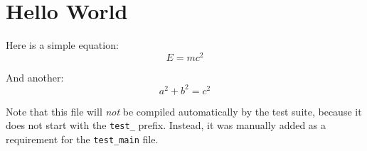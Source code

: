 \documentclass{report}
\numberwithin{equation}{chapter}
\begin{document}
\chapter{Hello World}
\label{chap:external}

Here is a simple equation:
\begin{equation}
E = mc^2
\label{eq:external_1}
\end{equation}

And another:
\begin{equation}
a^2 + b^2 = c^2
\label{eq:external_2}
\end{equation}

Note that this file will \emph{not} be compiled automatically by the test suite, because it does not start with the \texttt{test\_} prefix. Instead, it was manually added as a requirement for the \texttt{test\_main} file.
\end{document}
